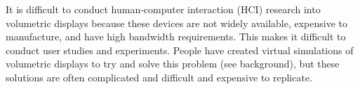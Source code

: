 \begin{tcbraster}[raster columns=2,raster equal height=rows]
\hfill
{}
\end{tcbraster}

It is difficult to conduct human-computer interaction (HCI) research into volumetric displays because these devices are not widely available, expensive to manufacture, and have high bandwidth requirements. This makes it difficult to conduct user studies and experiments. People have created virtual simulations of volumetric displays to try and solve this problem (see background), but these solutions are often complicated and difficult and expensive to replicate.

